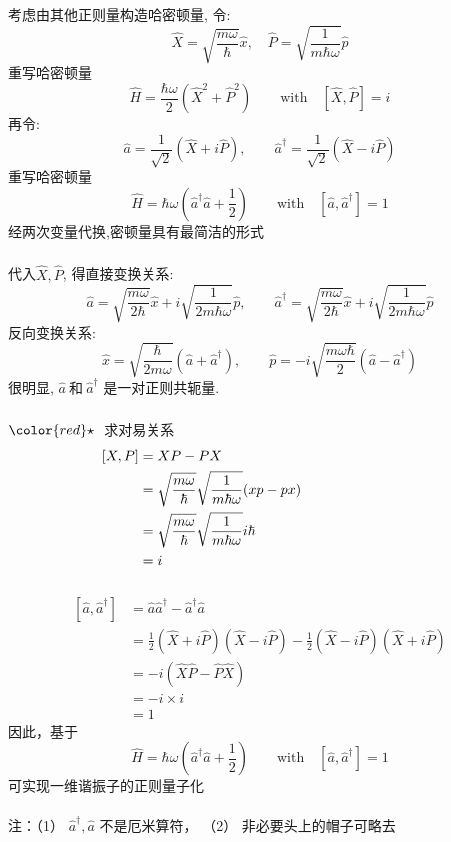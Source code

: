 \begin{frame}
    \frametitle{}
  考虑由其他正则量构造哈密顿量, 令: 
    \[ \hat{X} = \sqrt{\frac{m\omega}{\hbar}}\hat{x}, \quad \hat{P} = \sqrt{\frac{1}{m \hbar \omega}} \hat{p} \]
  重写哈密顿量
    \[  \hat{H}= \frac{\hbar \omega }{2} (\hat{X}^2 + \hat{P}^2 ) \qquad \text{with} \quad [\hat{X},\hat{P}]=i \]
  再令:
  \[ \hat{a}= \frac{1 }{\sqrt{2}} (\hat{X} + i\hat{P} ), \qquad \hat{a}^\dagger= \frac{1 }{\sqrt{2}} (\hat{X} - i\hat{P} ) \]
  重写哈密顿量
  \[  \boxed{\hat{H}= \hbar \omega \left(\hat{a}^\dagger \hat{a} + \frac{1 }{2}\right) \qquad \text{with} \quad [\hat{a},\hat{a}^\dagger]=1}  \]
 经两次变量代换,密顿量具有最简洁的形式
\end{frame}

\begin{frame}
    \frametitle{}
    代入$ \hat{X}, \hat{P} $, 得直接变换关系:
    \[ \hat{a}= \sqrt{\frac{m\omega}{2\hbar}}\hat{x} + i \sqrt{\frac{1}{2 m \hbar \omega}} \hat{p}, \qquad 
    \hat{a}^\dagger= \sqrt{\frac{m\omega}{2\hbar}}\hat{x} + i \sqrt{\frac{1}{2 m \hbar \omega}} \hat{p}\]
    反向变换关系:
    \[ \hat{x}= \sqrt{\frac{\hbar}{2m\omega}} (\hat{a}+ \hat{a}^\dagger), \qquad 
    \hat{p}= -i \sqrt{\frac{m \omega \hbar}{2}} (\hat{a}-\hat{a}^\dagger)\]
    很明显, $ \hat{a}~\text{和}~\hat{a}^\dagger $ 是一对正则共轭量.  \\
\end{frame}

\begin{frame}
    \frametitle{}   
    ${\color{red}\star}~$ 求对易关系 
  \[ \begin{aligned}
      [X,P] &=   XP- PX \\ 
      &=  \sqrt{\frac{m\omega}{\hbar}} \sqrt{\frac{1}{m \hbar \omega}}   (xp-px)  {\hspace*{8em}}~\\
      &=  \sqrt{\frac{m\omega}{\hbar}} \sqrt{\frac{1}{m \hbar \omega}} i \hbar  \\
      &= i
  \end{aligned}\]
\end{frame}

\begin{frame}[label=current]
  \frametitle{}
  \[ \begin{aligned}
    [\hat{a},\hat{a}^\dagger] &=   \hat{a}\hat{a}^\dagger - \hat{a}^\dagger\hat{a} \\ 
    &= \frac{1}{2} (\hat{X} + i\hat{P} )  (\hat{X} - i\hat{P} )  - \frac{1}{2} (\hat{X} - i\hat{P} ) (\hat{X} + i\hat{P} )  \\
    &=  -i (\hat{X}\hat{P}-\hat{P}\hat{X}) \\
    &= -i \times i \\
    &= 1
\end{aligned}\]
因此，基于 
\[  \boxed{\hat{H}= \hbar \omega \left(\hat{a}^\dagger \hat{a} + \frac{1 }{2}\right) \qquad \text{with} \quad [\hat{a},\hat{a}^\dagger]=1}  \]
可实现一维谐振子的正则量子化 \\
~~\\ 
\alert{注：}（1） $ \hat{a}^\dagger, \hat{a}  $ 不是厄米算符， （2） 非必要头上的帽子可略去
\end{frame} 



